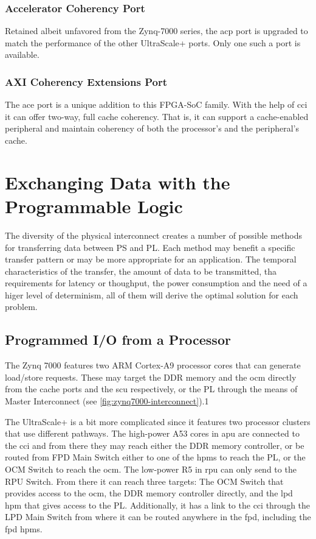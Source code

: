 \subsubsection{Accelerator Coherency Port}

Retained albeit unfavored from the Zynq-7000 series, the \gls{acp} port
is upgraded to match the performance of the other UltraScale+ ports.
Only one such a port is available.

\subsubsection{AXI Coherency Extensions Port}

The \gls{ace} port is a unique addition to this FPGA-SoC family. 
With the help of \gls{cci} it can offer two-way, full cache coherency.
That is, it can support a cache-enabled peripheral and maintain coherency of both
the processor's and the peripheral's cache.

\section{Exchanging Data with the Programmable Logic}

The diversity of the physical interconnect creates a number of 
possible methods for transferring data between PS and PL.
Each method may benefit a specific transfer pattern
or may be more appropriate for an application.
The temporal characteristics of the transfer,
the amount of data to be transmitted, 
tha requirements for latency or thoughput,
the power consumption and the need of a higer level of determinism,
all of them will derive the optimal solution for each problem.

\subsection{Programmed I/O from a Processor}

The Zynq 7000 features two ARM Cortex-A9 processor cores
that can generate load/store requests. These may target
the DDR memory and the \gls{ocm} directly from the cache ports
and the \gls{scu} respectively, or the PL through the means
of Master Interconnect (see \ref{fig:zynq7000-interconnect}).1

The UltraScale+ is a bit more complicated since it features
two processor clusters that use different pathways.
The high-power A53 cores in \gls{apu} are connected to the \gls{cci}
and from there they may reach either the DDR memory controller,
or be routed from FPD Main Switch either to one of the \acrlong{hpm}s to reach the PL,
or the OCM Switch to reach the \gls{ocm}.
The low-power R5 in \gls{rpu} can only send to the RPU Switch.
From there it can reach three targets: 
The OCM Switch that provides access to the \gls{ocm},
the DDR memory controller directly,
and the \gls{lpd} \gls{hpm} that gives access to the PL.
Additionally, it has a link to the \gls{cci} through the LPD Main Switch
from where it can be routed anywhere in the \acrlong{fpd}, including the \gls{fpd} \glspl{hpm}.


